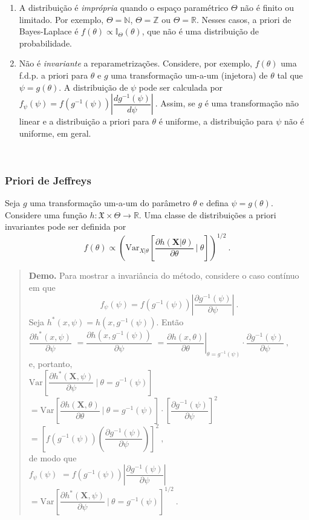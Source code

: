 \documentclass[
]{book}
\begin{document}
\begin{enumerate}
\def\labelenumi{\arabic{enumi}.}
\item
  A distribuição é \emph{imprópria} quando o espaço paramétrico \(\Theta\) não é finito ou limitado. Por exemplo, \(\Theta=\mathbb{N}\), \(\Theta=\mathbb{Z}\) ou \(\Theta=\mathbb{R}\). Nesses casos, a priori de Bayes-Laplace é \(f(\theta)\propto \mathbb{I}_\Theta(\theta)\), que não é uma distribuição de probabilidade.
\item
  Não é \emph{invariante} a reparametrizações. Considere, por exemplo, \(f(\theta)\) uma f.d.p. a priori para \(\theta\) e \(g\) uma transformação um-a-um (injetora) de \(\theta\) tal que \(\psi=g(\theta)\). A distribuição de \(\psi\) pode ser calculada por \(f_\psi(\psi) = f\left(g^{-1}(\psi)\right)\left|\dfrac{dg^{-1}(\psi)}{d\psi}\right|~.\) Assim, se \(g\) é uma transformação não linear e a distribuição a priori para \(\theta\) é uniforme, a distribuição para \(\psi\) não é uniforme, em geral.
\end{enumerate}

\(~\)

\hypertarget{priori-de-jeffreys}{%
\subsubsection{Priori de Jeffreys}\label{priori-de-jeffreys}}

Seja \(g\) uma transformação um-a-um do parâmetro \(\theta\) e defina \(\psi=g(\theta)\). Considere uma função \(h:\mathfrak{X}\times\Theta\longrightarrow\mathbb{R}\). Uma classe de distribuições a priori invariantes pode ser definida por
\[f(\theta) \propto \left(\text{Var}_{X|\theta}\left[\dfrac{\partial h(\boldsymbol X | \theta)}{\partial\theta}~\bigg|~\theta\right]\right)^{1/2}~.\]

\begin{quote}
\textbf{Demo.} Para mostrar a invariância do método, considere o caso contínuo em que
\[f_\psi(\psi) = f\left(g^{-1}(\psi)\right)\left|\dfrac{\partial g^{-1}(\psi)}{\partial\psi}\right|~.\]
Seja \(h^*(x,\psi)=h\left(x,g^{-1}(\psi)\right)\). Então\\
\(\dfrac{\partial h^*(x,\psi)}{\partial\psi}\)
\(=\dfrac{\partial h\left(x,g^{-1}(\psi)\right)}{\partial\psi}\)
\(=\left.\dfrac{\partial h(x,\theta)}{\partial\theta}\right|_{\theta=g^{-1}(\psi)}\cdot\dfrac{\partial g^{-1}(\psi)}{\partial\psi}~,\)\\
e, portanto,\\
\(\text{Var}\left[\dfrac{\partial h^*(\boldsymbol{X},\psi)}{\partial\psi}~\bigg|~\theta=g^{-1}(\psi)\right]\)
\(=\text{Var}\left[\dfrac{\partial h(\boldsymbol{X},\theta)}{\partial\theta}~\bigg|~\theta=g^{-1}(\psi)\right]\cdot\left[\dfrac{\partial g^{-1}(\psi)}{\partial\psi}\right]^2\)
\(=\left[f\left(g^{-1}(\psi)\right)\left(\dfrac{\partial g^{-1}(\psi)}{\partial\psi}\right)\right]^2~,\)\\
de modo que\\
\(f_\psi(\psi)\) \(=f\left(g^{-1}(\psi)\right)\left|\dfrac{\partial g^{-1}(\psi)}{\partial\psi}\right|\)
\(=\text{Var}\left[\dfrac{\partial h^*(\boldsymbol{X},\psi)}{\partial\psi}~\bigg|~\theta=g^{-1}(\psi)\right]^{1/2}~.\)
\end{quote}
\end{document}
